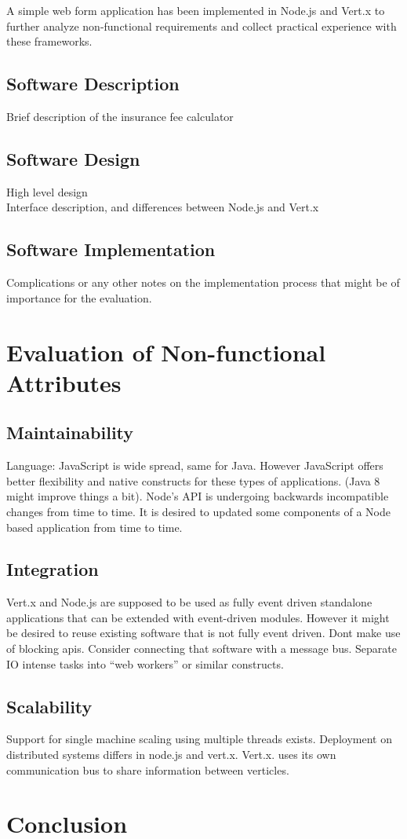 A simple web form application has been implemented in Node.js and Vert.x to
further analyze non-functional requirements and collect practical experience
with these frameworks.

\subsection{Software Description}
\label{software_description}
Brief description of the insurance fee calculator

\subsection{Software Design}
\label{software_design}
High level design\\
Interface description, and differences between Node.js and Vert.x

\subsection{Software Implementation}
\label{software_implementation}
Complications or any other notes on the implementation process that might be of
importance for the evaluation.





\section{Evaluation of Non-functional Attributes}
\label{evaluation_nonfunctional}

\subsection{Maintainability}
\label{maintainability}
Language: JavaScript is wide spread, same for Java. However JavaScript offers
better flexibility and native constructs for these types of applications.
(Java 8 might improve things a bit).
Node's API is undergoing backwards incompatible changes from time to time.
It is desired to updated some components of a Node based application from
time to time.

\subsection{Integration}
\label{integration}
Vert.x and Node.js are supposed to be used as fully event driven standalone
applications that can be extended with event-driven modules.
However it might be desired to reuse existing software that is not fully event
driven.
Dont make use of blocking apis.
Consider connecting that software with a message bus.
Separate IO intense tasks into ``web workers'' or similar constructs.

\subsection{Scalability}
\label{scalability}
Support for single machine scaling using multiple threads exists.
Deployment on distributed systems differs in node.js and vert.x.
Vert.x. uses its own communication bus to share information between verticles.


\section{Conclusion}
\label{conclusion}
